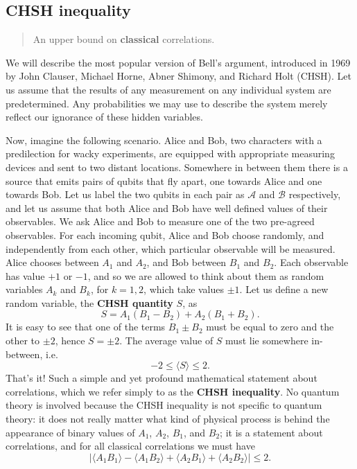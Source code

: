 \documentclass[fleqn]{article}
\begin{document}
\hypertarget{chsh-inequality}{%
\subsection{CHSH inequality}\label{chsh-inequality}}

\begin{quote}
An upper bound on \textbf{classical} correlations.
\end{quote}

We will describe the most popular version of Bell's argument, introduced in 1969 by John Clauser, Michael Horne, Abner Shimony, and Richard Holt (CHSH).
Let us assume that the results of any measurement on any individual system are predetermined.
Any probabilities we may use to describe the system merely reflect our ignorance of these hidden variables.

Now, imagine the following scenario.
Alice and Bob, two characters with a predilection for wacky experiments, are equipped with appropriate measuring devices and sent to two distant locations.
Somewhere in between them there is a source that emits pairs of qubits that fly apart, one towards Alice and one towards Bob.
Let us label the two qubits in each pair as \(\mathcal{A}\) and \(\mathcal{B}\) respectively, and let us assume that both Alice and Bob have well defined values of their observables.
We ask Alice and Bob to measure one of the two pre-agreed observables.
For each incoming qubit, Alice and Bob choose randomly, and independently from each other, which particular observable will be measured.
Alice chooses between \(A_1\) and \(A_2\), and Bob between \(B_1\) and \(B_2\).
Each observable has value \(+1\) or \(-1\), and so we are allowed to think about them as random variables \(A_k\) and \(B_k\), for \(k=1,2\), which take values \(\pm 1\).
Let us define a new random variable, the \textbf{CHSH quantity} \(S\), as
\[
  S = A_1(B_1 - B_2) + A_2(B_1 + B_2).
\]
It is easy to see that one of the terms \(B_1\pm B_2\) must be equal to zero and the other to \(\pm 2\), hence \(S=\pm2\).
The average value of \(S\) must lie somewhere in-between, i.e.
\[
  -2 \leqslant\langle S\rangle \leqslant 2.
\]
That's it!
Such a simple and yet profound mathematical statement about correlations, which we refer simply to as the \textbf{CHSH inequality}.
No quantum theory is involved because the CHSH inequality is not specific to quantum theory: it does not really matter what kind of physical process is behind the appearance of binary values of \(A_1\), \(A_2\), \(B_1\), and \(B_2\); it is a statement about correlations, and for all classical correlations we must have
\[
  |
    \langle A_1 B_1\rangle - \langle A_1 B_2\rangle + \langle A_2 B_1\rangle + \langle A_2 B_2\rangle
  | \leqslant 2.
\]
\end{document}
